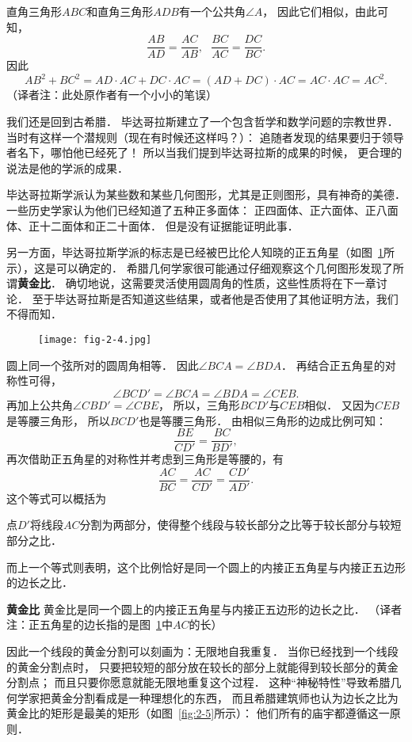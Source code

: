 \documentclass[cn,fancy,blue,11pt]{elegantbook}
\begin{document}
直角三角形$ABC$和直角三角形$ADB$有一个公共角$\angle A$，
因此它们相似，由此可知，
\[\frac{AB}{AD}=\frac{AC}{AB},~~~\frac{BC}{AC}=\frac{DC}{BC}.\]
因此\[AB^2+BC^2=AD\cdot AC+DC\cdot AC=(AD+DC)\cdot AC=AC\cdot AC=AC^2.\]
（译者注：此处原作者有一个小小的笔误）

我们还是回到古希腊．
毕达哥拉斯建立了一个包含哲学和数学问题的宗教世界．
当时有这样一个潜规则（现在有时候还这样吗？）：
追随者发现的结果要归于领导者名下，哪怕他已经死了！
所以当我们提到毕达哥拉斯的成果的时候，
更合理的说法是他的学派的成果．

毕达哥拉斯学派认为某些数和某些几何图形，尤其是正则图形，具有神奇的美德．
一些历史学家认为他们已经知道了五种正多面体：
正四面体、正六面体、正八面体、正十二面体和正二十面体．
但是没有证据能证明此事．

另一方面，毕达哥拉斯学派的标志是已经被巴比伦人知晓的正五角星（如图~\ref{fig:2-4}所示），这是可以确定的．
希腊几何学家很可能通过仔细观察这个几何图形发现了所谓\textbf{黄金比}．
确切地说，这需要灵活使用圆周角的性质，这些性质将在下一章讨论．
至于毕达哥拉斯是否知道这些结果，或者他是否使用了其他证明方法，我们不得而知．

\begin{figure}[htbp]
	\centering
	\texttt{[image: fig-2-4.jpg]}
	\caption{\label{fig:2-4}}
\end{figure}

圆上同一个弦所对的圆周角相等．
因此$\angle BCA=\angle BDA$．
再结合正五角星的对称性可得，
\[\angle BCD'=\angle BCA=\angle BDA=\angle CEB.\]
再加上公共角$\angle CBD'=\angle CBE$，
所以，三角形$BCD'$与$CEB$相似．
又因为$CEB$是等腰三角形，
所以$BCD'$也是等腰三角形．
由相似三角形的边成比例可知：
\[\frac{BE}{CD'}=\frac{BC}{BD'},\]
再次借助正五角星的对称性并考虑到三角形是等腰的，有
\[\frac{AC}{BC}=\frac{AC}{CD'}=\frac{CD'}{AD'}.\]
这个等式可以概括为
\begin{framed}
	点$D'$将线段$AC$分割为两部分，使得整个线段与较长部分之比等于较长部分与较短部分之比．
\end{framed}
而上一个等式则表明，这个比例恰好是同一个圆上的内接正五角星与内接正五边形的边长之比．

\textbf{黄金比} 黄金比是同一个圆上的内接正五角星与内接正五边形的边长之比．
（译者注：正五角星的边长指的是图~\ref{fig:2-4}中$AC$的长）

因此一个线段的黄金分割可以刻画为：无限地自我重复．
当你已经找到一个线段的黄金分割点时，
只要把较短的部分放在较长的部分上就能得到较长部分的黄金分割点；
而且只要你愿意就能无限地重复这个过程．
这种``神秘特性''导致希腊几何学家把黄金分割看成是一种理想化的东西，
而且希腊建筑师也认为边长之比为黄金比的矩形是最美的矩形（如图~\ref{fig:2-5}所示）：
他们所有的庙宇都遵循这一原则．
\end{document}
